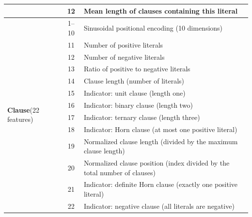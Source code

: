 \begin{table}[htbp]
{\begin{tabular}{@{} p{} c p{} @{}}
			                   & 12            & Mean length of clauses containing this literal                            \\
			\midrule
			\multirow{13}{=}{\textbf{Clause}\newline(22 features)}
			                   & 1--10         & Sinusoidal positional encoding (10 dimensions)                            \\
			                   & 11            & Number of positive literals                                               \\
			                   & 12            & Number of negative literals                                               \\
			                   & 13            & Ratio of positive to negative literals                                    \\
			                   & 14            & Clause length (number of literals)                                        \\
			                   & 15            & Indicator: unit clause (length one)                                       \\
			                   & 16            & Indicator: binary clause (length two)                                     \\
			                   & 17            & Indicator: ternary clause (length three)                                  \\
			                   & 18            & Indicator: Horn clause (at most one positive literal)                     \\
			                   & 19            & Normalized clause length (divided by the maximum clause length)           \\
			                   & 20            & Normalized clause position (index divided by the total number of clauses) \\
			                   & 21            & Indicator: definite Horn clause (exactly one positive literal)            \\
			                   & 22            & Indicator: negative clause (all literals are negative)                    \\
			\bottomrule
		\end{tabular}}
\end{table}

